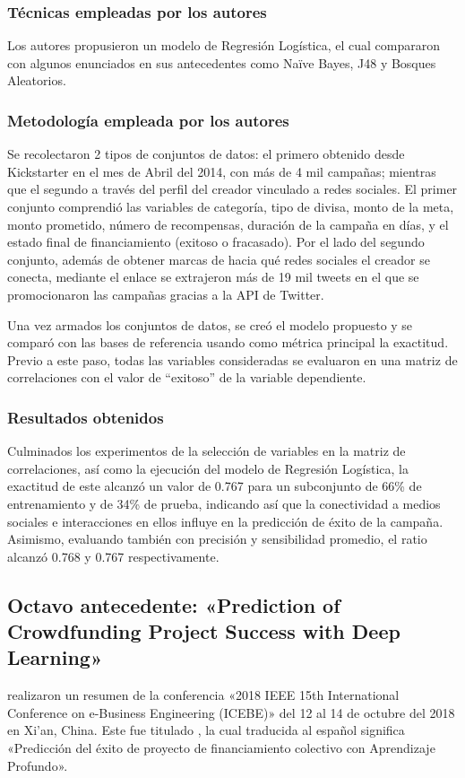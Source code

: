 \subsubsection{Técnicas empleadas por los autores}
Los autores propusieron un modelo de Regresión Logística, el cual compararon con algunos enunciados en sus antecedentes como Naïve Bayes, J48 y Bosques Aleatorios.

\subsubsection{Metodología empleada por los autores}
Se recolectaron 2 tipos de conjuntos de datos: el primero obtenido desde Kickstarter en el mes de Abril del 2014, con más de 4 mil campañas; mientras que el segundo a través del perfil del creador vinculado a redes sociales. El primer conjunto comprendió las variables de categoría, tipo de divisa, monto de la meta, monto prometido, número de recompensas, duración de la campaña en días, y el estado final de financiamiento (exitoso o fracasado). Por el lado del segundo conjunto, además de obtener marcas de hacia qué redes sociales el creador se conecta, mediante el enlace se extrajeron más de 19 mil tweets en el que se promocionaron las campañas gracias a la API de Twitter.

Una vez armados los conjuntos de datos, se creó el modelo propuesto y se comparó con las bases de referencia usando como métrica principal la exactitud. Previo a este paso, todas las variables consideradas se evaluaron en una matriz de correlaciones con el valor de “exitoso” de la variable dependiente.

\subsubsection{Resultados obtenidos}
Culminados los experimentos de la selección de variables en la matriz de correlaciones, así como la ejecución del modelo de Regresión Logística, la exactitud de este alcanzó un valor de 0.767 para un subconjunto de 66\% de entrenamiento y de 34\% de prueba, indicando así que la conectividad a medios sociales e interacciones en ellos influye en la predicción de éxito de la campaña. Asimismo, evaluando también con precisión y sensibilidad promedio, el ratio alcanzó 0.768 y 0.767 respectivamente.


\subsection{Octavo antecedente: «Prediction of Crowdfunding Project Success with Deep Learning» \citep*{pr_yu2018deeplearning}}
\citeauthor{pr_yu2018deeplearning} realizaron un resumen de la conferencia «2018 IEEE 15th International Conference on e-Business Engineering (ICEBE)» del 12 al 14 de octubre del 2018 en Xi'an, China. Este fue titulado , la cual traducida al español significa «Predicción del éxito de proyecto de financiamiento colectivo con Aprendizaje Profundo».

